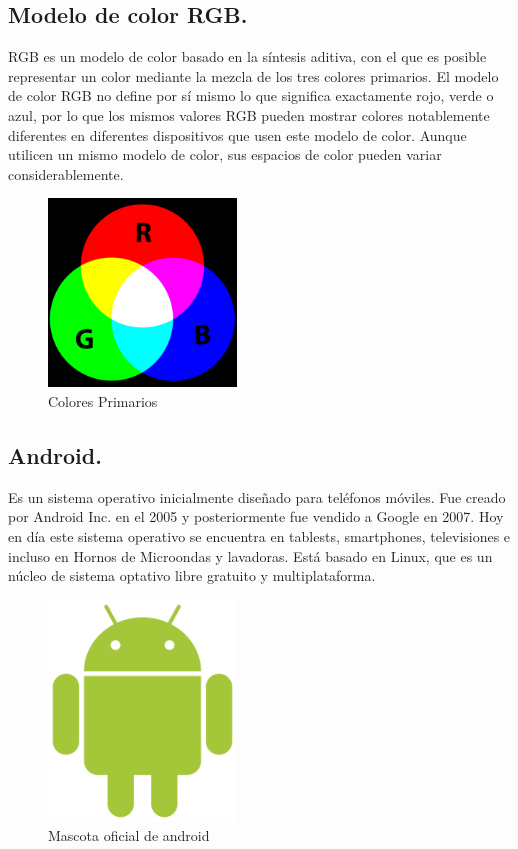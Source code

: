 \documentclass[12pt]{article}
\begin{document}
\subsection{Modelo de color RGB.}
RGB es un modelo de color basado en la síntesis aditiva, con el que es posible representar un color mediante la mezcla de los tres colores primarios. El modelo de color RGB no define por sí mismo lo que significa exactamente rojo, verde o azul, por lo que los mismos valores RGB pueden mostrar colores notablemente diferentes en diferentes dispositivos que usen este modelo de color. Aunque utilicen un mismo modelo de color, sus espacios de color pueden variar considerablemente.
\cite{Espania}
\newline
\begin{figure}[hbtp]
\centering
\includegraphics[width = 5cm]{rgb.png}
\caption{Colores Primarios}
\end{figure}

\subsection{Android.}
Es un sistema operativo inicialmente diseñado para teléfonos móviles. Fue creado por Android Inc. en el 2005 y posteriormente fue vendido a Google en 2007. Hoy en día este sistema operativo se encuentra en tablests, smartphones, televisiones e incluso en Hornos de Microondas y lavadoras. Está basado en Linux, que es un núcleo de sistema optativo libre gratuito y multiplataforma. \cite{Arias}
\newline
\begin{figure}[hbtp]
\centering
\includegraphics[width = 5cm]{android.png}
\caption{Mascota oficial de android}
\end{figure}
\end{document}
